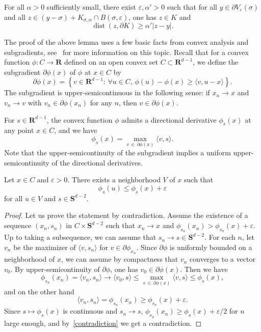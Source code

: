 \documentclass[AHL,Unicode,longabstracts,published]{cedram}
\DeclareMathOperator{\dist}{dist}
\newcommand{\bfS}{\mathbf{S}}
\newcommand{\bfR}{\mathbf{R}}
\renewcommand{\epsilon}{\varepsilon}
\renewcommand{\leq}{\leqslant}
\renewcommand{\geq}{\geqslant}
\let\oldforall\forall
\renewcommand*{\forall}{\mathrel{\oldforall}}
\begin{document}
\begin{lemm}\label{inclusion_smaller_cone}
For all $\alpha>0$ sufficiently small, there exist $\epsilon,\alpha'>0$ such that for all $y\in \partial V_{\epsilon}(\sigma)$ and all $z\in (y-\sigma)+K_{\sigma,\alpha}\cap B(\sigma,\epsilon)$, one has $z\in K$ and
\[
\dist(z,\partial K)\geq\alpha'|z-y|.
\]
\end{lemm}

The proof of the above lemma uses a few basic facts from convex analysis and subgradients, see~\cite[Section~D]{HiLe-01} for more information on this topic. Recall that for a convex function $\phi: C\rightarrow \bfR$ defined on an open convex set $C\subset \bfR^{d-1}$, we define the subgradient $\partial \phi (x)$ of $\phi$ at $x\in C$ by
\[
\partial \phi (x)=\left\{ v\in \bfR^{d-1}:\, \forall u\in C,\,\phi(u)-\phi(x)\geq \langle v,u-x\rangle\right\}.
\]
The subgradient is upper-semicontinuous in the following sense: if $x_{n}\rightarrow x$ and $v_{n}\rightarrow v$ with $v_{n}\in \partial\phi(x_{n})$ for any $n$, then $v\in \partial\phi(x)$.

For $s\in\bfR^{d-1}$, the convex function $\phi$ admits a directional derivative $\phi_{s}(x)$ at any point $x\in C$, and we have
\[
\phi_{s}(x)=\max_{v\,\in\,\partial \phi(x)}\langle v,s\rangle.
\]
Note that the upper-semicontinuity of the subgradient implies a uniform upper-semicontinuity of the directional derivatives.

\begin{lemm}\label{upper_continuity_derivative}
Let $x\in C$ and $\epsilon>0$. There exists a neighborhood $V$ of $x$ such that
\[
\phi_{s}(u)\leq \phi_{s}(x)+\epsilon
\]
for all $u\in V$ and $s\in \bfS^{d-2}$.
\end{lemm}


\begin{proof}
Let us prove the statement by contradiction. Assume the existence of a sequence $(x_{n},s_{n})$ in $C\times \bfS^{d-2}$ such that $x_{n}\rightarrow x$ and $\phi_{s_{n}}(x_{n})> \phi_{s_{n}}(x)+\epsilon$. Up to taking a subsequence, we can assume that $s_{n}\rightarrow s\in \bfS^{d-2}$. For each $n$, let $v_{n}$ be the maximizer of $\langle v,s_{n}\rangle$ for $v\in \partial\phi_{x_{n}}$. Since $\partial \phi$ is uniformly bounded on a neighborhood of $x$, we can assume by compactness that $v_{n}$ converges to a vector $v_{0}$. By upper-semicontinuity of $\partial \phi$, one has $v_{0}\in \partial \phi(x)$. Then we have
\begin{equation}\label{contradiction}
\phi_{s_{n}}(x_{n})=\langle v_{n},s_{n}\rangle \rightarrow \langle v_{0},s\rangle\leq \max_{v\,\in\,\partial \phi(x)}\langle v,s\rangle\leq \phi_{s}(x),
\end{equation}
and on the other hand
\[
\langle v_{n},s_{n}\rangle= \phi_{s_{n}}(x_{n})\geq \phi_{s_{n}}(x)+\epsilon.
\]
Since $s\mapsto \phi_{s}(x)$ is continuous and $s_{n}\rightarrow s$, $\phi_{s_{n}}(x_{n})\geq \phi_{s}(x) +\epsilon/2$ for $n$ large enough, and by~\eqref{contradiction} we get a contradiction.
\end{proof}
\end{document}
